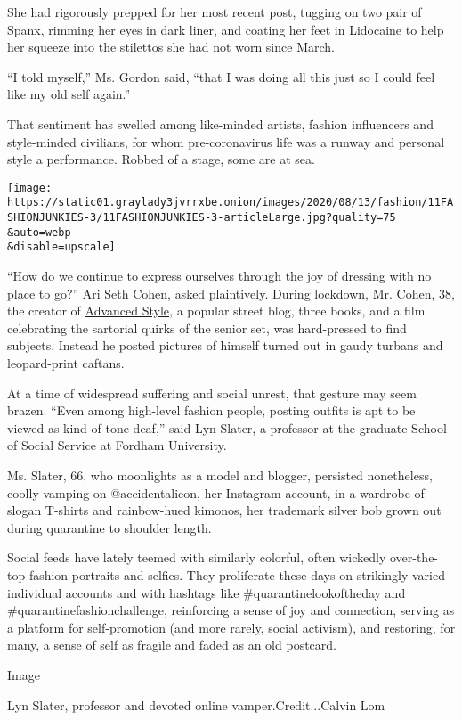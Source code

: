 She had rigorously prepped for her most recent post, tugging on two pair
of Spanx, rimming her eyes in dark liner, and coating her feet in
Lidocaine to help her squeeze into the stilettos she had not worn since
March.

``I told myself,'' Ms. Gordon said, ``that I was doing all this just so
I could feel like my old self again.''

That sentiment has swelled among like-minded artists, fashion
influencers and style-minded civilians, for whom pre-coronavirus life
was a runway and personal style a performance. Robbed of a stage, some
are at sea.

\texttt{[image: https://static01.graylady3jvrrxbe.onion/images/2020/08/13/fashion/11FASHIONJUNKIES-3/11FASHIONJUNKIES-3-articleLarge.jpg?quality=75\\\&auto=webp\\\&disable=upscale]}

``How do we continue to express ourselves through the joy of dressing
with no place to go?'' Ari Seth Cohen, asked plaintively. During
lockdown, Mr. Cohen, 38, the creator of
\href{https://www.advanced.style/}{Advanced Style,} a popular street
blog, three books, and a film celebrating the sartorial quirks of the
senior set, was hard-pressed to find subjects. Instead he posted
pictures of himself turned out in gaudy turbans and leopard-print
caftans.

At a time of widespread suffering and social unrest, that gesture may
seem brazen. ``Even among high-level fashion people, posting outfits is
apt to be viewed as kind of tone-deaf,'' said Lyn Slater, a professor at
the graduate School of Social Service at Fordham University.

Ms. Slater, 66, who moonlights as a model and blogger, persisted
nonetheless, coolly vamping on @accidentalicon, her Instagram account,
in a wardrobe of slogan T-shirts and rainbow-hued kimonos, her trademark
silver bob grown out during quarantine to shoulder length.

Social feeds have lately teemed with similarly colorful, often wickedly
over-the-top fashion portraits and selfies. They proliferate these days
on strikingly varied individual accounts and with hashtags like
\#quarantinelookoftheday and \#quarantinefashionchallenge, reinforcing a
sense of joy and connection, serving as a platform for self-promotion
(and more rarely, social activism), and restoring, for many, a sense of
self as fragile and faded as an old postcard.

Image

Lyn Slater, professor and devoted online vamper.Credit...Calvin Lom


